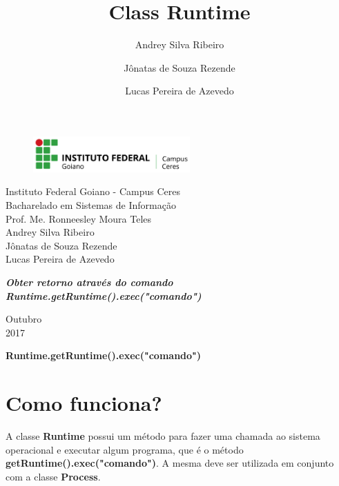 \documentclass[14pt, a4paper]{article}
\title{Class Runtime}
\author{Andrey Silva Ribeiro \and Jônatas de Souza Rezende \and Lucas Pereira de Azevedo}
\begin{document}
\begin{titlepage}


\begin{center}
\begin{figure}[htb]
		
		\label{figura:LogoIF}
	
		\centering
		\includegraphics[width=6cm]{logo.png} 
\end{figure}


Instituto Federal Goiano - Campus Ceres\\
Bacharelado em Sistemas de Informação\\
Prof. Me. Ronneesley Moura Teles\\\vspace{0.2cm}
Andrey Silva Ribeiro \\
Jônatas de Souza Rezende \\
Lucas Pereira de Azevedo \\\vspace{7.0cm}

\textit{\textbf{\Large{Obter retorno através do comando}}}\\\vspace{0.5cm}
\textit{\textbf{\Large{Runtime.getRuntime().exec("comando")}}}\\\vspace{9.5cm}

Outubro\\
2017\\
\end{center}
\end{titlepage}

\tableofcontents

\newpage
\begin{center}
\textbf{\Large{Runtime.getRuntime().exec("comando")}}\\\vspace{0.5cm}
\end{center}
\section{Como funciona?}%

A classe \textbf{Runtime} possui um método para fazer uma chamada ao sistema operacional e executar algum programa, que é o método \textbf{getRuntime().exec("comando")}. A mesma deve ser utilizada em conjunto com a classe \textbf{Process}.
\end{document}
